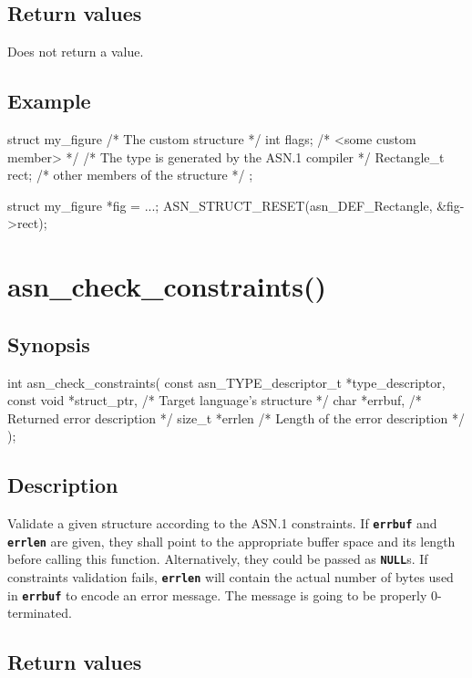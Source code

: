 \documentclass[english,oneside,12pt]{book}
\newcommand{\apisection}[2]{\clearpage\section{\label{#1}#2}}
\newcommand{\code}[1]{\texttt{\textbf{\lstinline{#1}}}}
\begin{document}
\subsection*{Return values}
Does not return a value.

\subsection*{Example}

\begin{example}
struct my_figure {       /* The custom structure */
    int flags;           /* <some custom member> */
    /* The type is generated by the ASN.1 compiler */
    Rectangle_t rect;
    /* other members of the structure */
};

struct my_figure *fig = ...;
ASN_STRUCT_RESET(asn_DEF_Rectangle, &fig->rect);
\end{example}

\apisection{sec:asn_check_constraints}{asn\_check\_constraints()}

\subsection*{Synopsis}

\begin{signature}
int asn_check_constraints(
    const asn_TYPE_descriptor_t *type_descriptor,
    const void *struct_ptr, /* Target language's structure */
    char *errbuf,           /* Returned error description */
    size_t *errlen          /* Length of the error description */
);
\end{signature}

\subsection*{Description}

Validate a given structure according to the ASN.1 constraints.
If \code{errbuf} and \code{errlen} are given, they shall point to the
appropriate buffer space and its length before calling this function.
Alternatively, they could be passed as \code{NULL}s.
If constraints validation fails, \code{errlen} will contain the actual
number of bytes used in \code{errbuf} to encode an error message.
The message is going to be properly 0-terminated.

\subsection*{Return values}
\end{document}
